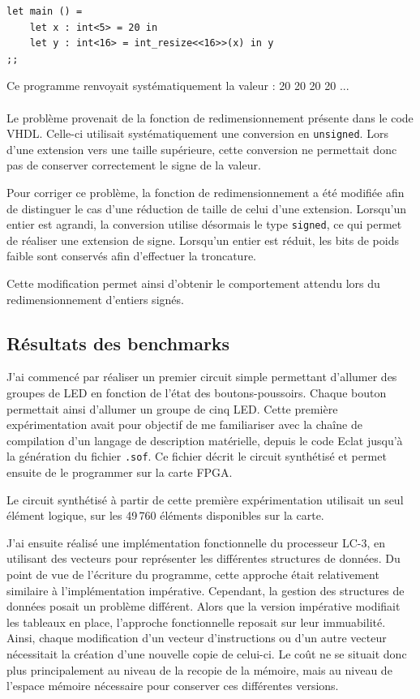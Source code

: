 \documentclass{article}
\begin{document}
\begin{lstlisting}
let main () =
    let x : int<5> = 20 in
    let y : int<16> = int_resize<<16>>(x) in y
;;
\end{lstlisting}
Ce programme renvoyait systématiquement la valeur : 20 20 20 20 ...\\
\\
Le problème provenait de la fonction de redimensionnement présente
dans le code VHDL. Celle-ci utilisait systématiquement une conversion
en \texttt{unsigned}. Lors d'une extension vers une taille supérieure,
cette conversion ne permettait donc pas de conserver correctement le
signe de la valeur.

Pour corriger ce problème, la fonction de redimensionnement a été
modifiée afin de distinguer le cas d'une réduction de taille de celui
d'une extension. Lorsqu'un entier est agrandi, la conversion utilise
désormais le type \texttt{signed}, ce qui permet de réaliser une
extension de signe. Lorsqu'un entier est réduit, les bits de poids
faible sont conservés afin d'effectuer la troncature.

Cette modification permet ainsi d'obtenir le comportement attendu lors
du redimensionnement d'entiers signés.

\newpage
\subsection{Résultats des benchmarks}
J'ai commencé par réaliser un premier circuit simple permettant d'allumer
des groupes de LED en fonction de l'état des boutons-poussoirs. Chaque
bouton permettait ainsi d'allumer un groupe de cinq LED. Cette première
expérimentation avait pour objectif de me familiariser avec la chaîne de
compilation d'un langage de description matérielle, depuis le code Eclat
jusqu'à la génération du fichier \texttt{.sof}. Ce fichier décrit le
circuit synthétisé et permet ensuite de le programmer sur la carte FPGA.

Le circuit synthétisé à partir de cette première expérimentation
utilisait un seul élément logique, sur les 49\,760 éléments disponibles
sur la carte.

J'ai ensuite réalisé une implémentation fonctionnelle du processeur LC-3,
en utilisant des vecteurs pour représenter les différentes structures de
données. Du point de vue de l'écriture du programme, cette approche était
relativement similaire à l'implémentation impérative. Cependant, la
gestion des structures de données posait un problème différent. Alors que
la version impérative modifiait les tableaux en place, l'approche
fonctionnelle reposait sur leur immuabilité. Ainsi, chaque modification
d'un vecteur d'instructions ou d'un autre vecteur nécessitait la création
d'une nouvelle copie de celui-ci. Le coût ne se situait donc plus
principalement au niveau de la recopie de la mémoire, mais au niveau de
l'espace mémoire nécessaire pour conserver ces différentes versions.
\end{document}
